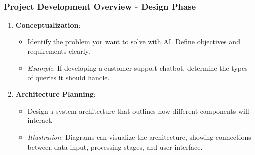 \documentclass[aspectratio=169]{beamer}
\begin{document}
\begin{frame}[fragile]
    \frametitle{Project Development Overview - Design Phase}
    \begin{enumerate}
        \item \textbf{Conceptualization}:
        \begin{itemize}
            \item Identify the problem you want to solve with AI. Define objectives and requirements clearly.
            \item \textit{Example}: If developing a customer support chatbot, determine the types of queries it should handle.
        \end{itemize}
        
        \item \textbf{Architecture Planning}:
        \begin{itemize}
            \item Design a system architecture that outlines how different components will interact.
            \item \textit{Illustration}: Diagrams can visualize the architecture, showing connections between data input, processing stages, and user interface.
        \end{itemize}
    \end{enumerate}
\end{frame}
\end{document}
